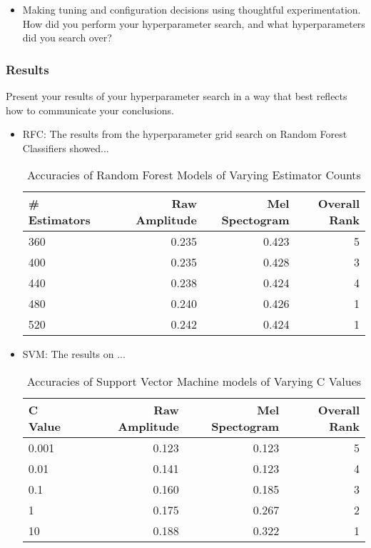 \documentclass[11pt]{article}
\begin{document}
  \begin{itemize}
  \item Making tuning and configuration decisions using thoughtful experimentation.  
    How did you perform your hyperparameter search, and what hyperparameters did you search over?
  \end{itemize}

\subsubsection{Results}
Present your results of your hyperparameter search in a way that best reflects how to communicate your conclusions.

\begin{itemize}
    \item RFC: The results from the hyperparameter grid search on Random Forest Classifiers showed...
    \begin{table}[ht]
    \centering
    \begin{tabular}{llrrr}
        \toprule
        \# Estimators & & Raw Amplitude & Mel Spectogram & Overall Rank \\
        \midrule
        \textsc{360} & & 0.235 & 0.423 & 5 \\
        \textsc{400} & & 0.235 & 0.428 & 3 \\
        \textsc{440} & & 0.238 & 0.424 & 4 \\
        \textsc{480} & & 0.240 & 0.426 & 1 \\
        \textsc{520} & & 0.242 & 0.424 & 1 \\
        \bottomrule
    \end{tabular}
    \caption{\label{tab:rf_search_results} Accuracies of Random Forest Models of Varying Estimator Counts}
    \end{table}
    
    \item SVM: The results on ...
    \begin{table}[ht]
    \centering
    \begin{tabular}{llrrr}
        \toprule
        C Value & & Raw Amplitude & Mel Spectogram & Overall Rank \\
        \midrule
        \textsc{0.001} & & 0.123 & 0.123 & 5 \\
        \textsc{0.01}  & & 0.141 & 0.123 & 4 \\
        \textsc{0.1}   & & 0.160 & 0.185 & 3 \\
        \textsc{1}     & & 0.175 & 0.267 & 2 \\
        \textsc{10}    & & 0.188 & 0.322 & 1 \\
        \bottomrule
    \end{tabular}
    \caption{\label{tab:svm_search_results} Accuracies of Support Vector Machine models of Varying C Values}
    \end{table}

\end{itemize}
\end{document}
